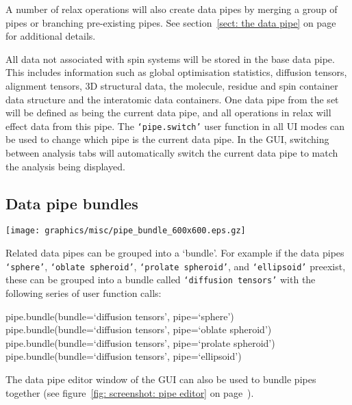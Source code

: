 
A number of relax operations will also create data pipes by merging a group of pipes or branching pre-existing pipes.  See section~\ref{sect: the data pipe} on page~\pageref{sect: the data pipe} for additional details.

All data not associated with spin systems will be stored in the base data pipe.  This includes information such as global optimisation statistics, diffusion tensors, alignment tensors, 3D structural data, the molecule, residue and spin container data structure and the interatomic data containers.  One data pipe from the set will be defined as being the current data pipe, and all operations in relax will effect data from this pipe.  The \texttt{`pipe.switch'} user function in all UI modes can be used to change which pipe is the current data pipe.  In the GUI, switching between analysis tabs will automatically switch the current data pipe to match the analysis being displayed.




\subsection{Data pipe bundles}

\begin{figure*}[h]
\texttt{[image: graphics/misc/pipe\_bundle\_600x600.eps.gz]}
\end{figure*}

Related data pipes can be grouped into a `bundle'.  For example if the data pipes \texttt{`sphere'}, \texttt{`oblate spheroid'}, \texttt{`prolate spheroid'}, and \texttt{`ellipsoid'} preexist, these can be grouped into a bundle called \texttt{`diffusion tensors'} with the following series of user function calls:

\begin{exampleenv}
pipe.bundle(bundle=`diffusion tensors', pipe=`sphere') \\
pipe.bundle(bundle=`diffusion tensors', pipe=`oblate spheroid') \\
pipe.bundle(bundle=`diffusion tensors', pipe=`prolate spheroid') \\
pipe.bundle(bundle=`diffusion tensors', pipe=`ellipsoid')
\end{exampleenv}

The data pipe editor window of the GUI can also be used to bundle pipes together (see figure~\ref{fig: screenshot: pipe editor} on page~\pageref{fig: screenshot: pipe editor}).



